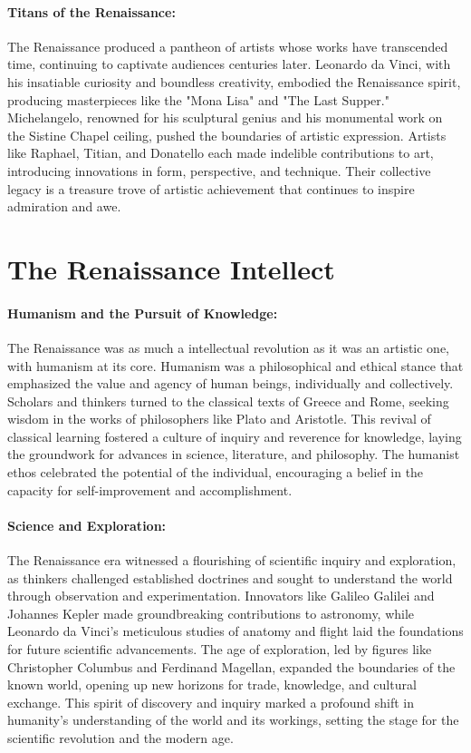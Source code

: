 \documentclass[a4paper,12pt]{book}
\begin{document}
\paragraph{Titans of the Renaissance:}
The Renaissance produced a pantheon of artists whose works have transcended time, continuing to captivate audiences centuries later. Leonardo da Vinci, with his insatiable curiosity and boundless creativity, embodied the Renaissance spirit, producing masterpieces like the "Mona Lisa" and "The Last Supper." Michelangelo, renowned for his sculptural genius and his monumental work on the Sistine Chapel ceiling, pushed the boundaries of artistic expression. Artists like Raphael, Titian, and Donatello each made indelible contributions to art, introducing innovations in form, perspective, and technique. Their collective legacy is a treasure trove of artistic achievement that continues to inspire admiration and awe.

\section*{The Renaissance Intellect}

\paragraph{Humanism and the Pursuit of Knowledge:}
The Renaissance was as much a intellectual revolution as it was an artistic one, with humanism at its core. Humanism was a philosophical and ethical stance that emphasized the value and agency of human beings, individually and collectively. Scholars and thinkers turned to the classical texts of Greece and Rome, seeking wisdom in the works of philosophers like Plato and Aristotle. This revival of classical learning fostered a culture of inquiry and reverence for knowledge, laying the groundwork for advances in science, literature, and philosophy. The humanist ethos celebrated the potential of the individual, encouraging a belief in the capacity for self-improvement and accomplishment.

\paragraph{Science and Exploration:}
The Renaissance era witnessed a flourishing of scientific inquiry and exploration, as thinkers challenged established doctrines and sought to understand the world through observation and experimentation. Innovators like Galileo Galilei and Johannes Kepler made groundbreaking contributions to astronomy, while Leonardo da Vinci's meticulous studies of anatomy and flight laid the foundations for future scientific advancements. The age of exploration, led by figures like Christopher Columbus and Ferdinand Magellan, expanded the boundaries of the known world, opening up new horizons for trade, knowledge, and cultural exchange. This spirit of discovery and inquiry marked a profound shift in humanity’s understanding of the world and its workings, setting the stage for the scientific revolution and the modern age.
\end{document}
